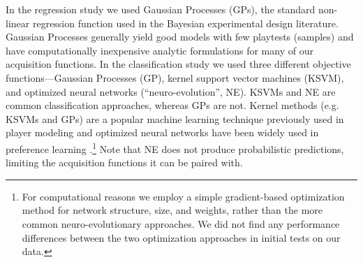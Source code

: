 \documentclass{sig-alternate}
\begin{document}
In the regression study we used Gaussian Processes (GPs), the standard non-linear regression function used in the Bayesian experimental design literature.
Gaussian Processes generally yield good models with few playtests (samples) and have computationally inexpensive analytic formulations for many of our acquisition functions.
In the classification study we used three different objective functions---Gaussian Processes (GP), kernel support vector machines (KSVM), and optimized neural networks (``neuro-evolution'', NE).
KSVMs and NE are common classification approaches, whereas GPs are not.
Kernel methods (e.g. KSVMs and GPs) are a popular machine learning technique previously used in player modeling \cite{yu2011:minboredom} and optimized neural networks have been widely used in preference learning \cite{yannakakis2011:edpcg}.\footnote{For computational reasons we employ a simple gradient-based optimization method for network structure, size, and weights, rather than the more common neuro-evolutionary approaches. 
We did not find any performance differences between the two optimization approaches in initial tests on our data.}
Note that NE does not produce probabilistic predictions, limiting the acquisition functions it can be paired with.




%
\end{document}

